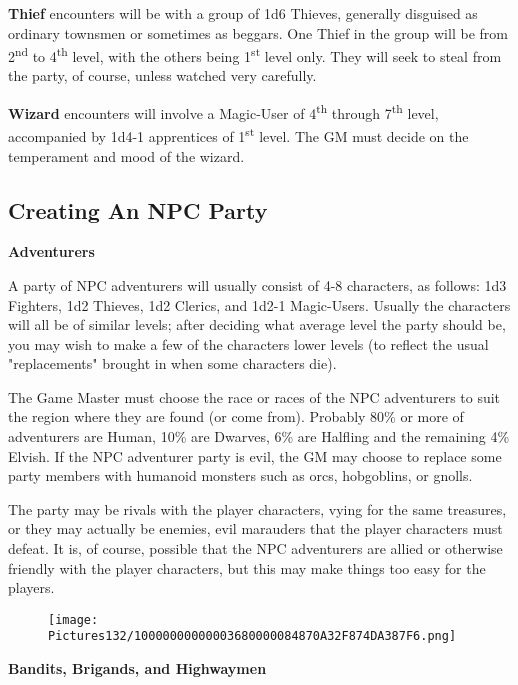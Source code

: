 \documentclass[a4paper,twoside,openany,10pt]{book}
\begin{document}
\begin{multicols}{2}
\textbf{Thief} encounters will be with a group of 1d6 Thieves, generally disguised as ordinary townsmen or sometimes as beggars. One Thief in the group will be from 2\textsuperscript{nd} to 4\textsuperscript{th} level, with the others being 1\textsuperscript{st} level only. They will seek to steal from the party, of course, unless watched very carefully. 

\textbf{Wizard }encounters will involve a Magic-User of 4\textsuperscript{th} through 7\textsuperscript{th} level, accompanied by 1d4-1 apprentices of 1\textsuperscript{st} level. The GM must decide on the temperament and mood of the wizard.

\subsection{Creating An NPC Party}\label{creating-an-npc-party}

\textbf{Adventurers}

A party of NPC adventurers will usually consist of 4-8 characters, as follows: 1d3 Fighters, 1d2 Thieves, 1d2 Clerics, and 1d2-1 Magic-Users. Usually the characters will all be of similar levels; after deciding what average level the party should be, you may wish to make a few of the characters lower levels (to reflect the usual "replacements" brought in when some characters die).

The Game Master must choose the race or races of the NPC adventurers to suit the region where they are found (or come from). Probably 80\% or more of adventurers are Human, 10\% are Dwarves, 6\% are Halfling and the remaining 4\% Elvish. If the NPC adventurer party is evil, the GM may choose to replace some party members with humanoid monsters such as orcs, hobgoblins, or gnolls.

The party may be rivals with the player characters, vying for the same treasures, or they may actually be enemies, evil marauders that the player characters must defeat. It is, of course, possible that the NPC adventurers are allied or otherwise friendly with the player characters, but this may make things too easy for the players.

\begin{wrapfigure}{r}{0.25\textwidth}
	\texttt{[image: Pictures132/10000000000003680000084870A32F874DA387F6.png]} 
\end{wrapfigure}

\textbf{Bandits, Brigands, and Highwaymen}


\end{multicols}
\end{document}
